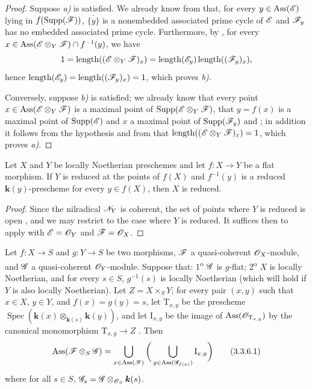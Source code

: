 \begin{proof}
Suppose \emph{a)} is satisfied.
We already know from  that, for every $y\in\operatorname{Ass}(\mathscr{E})$ lying in $f(\operatorname{Supp}(\mathscr{F}))$, $\overline{\{y\}}$ is a nonembedded associated prime cycle of $\mathscr{E}$ and $\mathscr{F}_y$ has no embedded associated prime cycle.
Furthermore, by , for every $x\in\operatorname{Ass}(\mathscr{E}\otimes_Y\mathscr{F})\cap f^{-1}(y)$, we have
\[
1=\operatorname{length}((\mathscr{E}\otimes_Y\mathscr{F})_x)
=\operatorname{length}(\mathscr{E}_y)\operatorname{length}((\mathscr{F}_y)_x),
\]
hence $\operatorname{length}(\mathscr{E}_y)=\operatorname{length}((\mathscr{F}_y)_x)=1$, which proves \emph{b)}.

Conversely, suppose \emph{b)} is satisfied; we already know that every point $x\in\operatorname{Ass}(\mathscr{E}\otimes_Y\mathscr{F})$ is a maximal point of $\operatorname{Supp}(\mathscr{E}\otimes_Y\mathscr{F})$, that $y=f(x)$ is a maximal point of $\operatorname{Supp}(\mathscr{E})$ and $x$ a maximal point of $\operatorname{Supp}(\mathscr{F}_y)$  and ; in addition it follows from the hypothesis and from  that $\operatorname{length}((\mathscr{E}\otimes_Y\mathscr{F})_x)=1$, which proves \emph{a)}.
\end{proof}

\begin{corollary}[3.3.5]
\label{IV.3.3.5}
Let $X$ and $Y$ be locally Noetherian preschemes and let $f:X\to Y$ be a flat morphism.
If $Y$ is reduced at the points of $f(X)$ and $f^{-1}(y)$ is a reduced $\boldsymbol{k}(y)$-prescheme for every $y\in f(X)$, then $X$ is reduced.
\end{corollary}

\begin{proof}
Since the nilradical $\mathscr{N}_Y$ is coherent, the set of points where $Y$ is reduced is open , and we may restrict to the case where $Y$ is reduced.
It suffices then to apply  with $\mathscr{E}=\mathscr{O}_Y$ and $\mathscr{F}=\mathscr{O}_X$.
\end{proof}

\begin{proposition}[3.3.6]
\label{IV.3.3.6}
Let $f:X\to S$ and $g:Y\to S$ be two morphisms, $\mathscr{F}$ a quasi-coherent $\mathscr{O}_X$-module, and $\mathscr{G}$ a quasi-coherent $\mathscr{O}_Y$-module.
Suppose that: 1\textsuperscript{o} $\mathscr{G}$ is $g$-flat; 2\textsuperscript{o} $X$ is locally Noetherian, and for every $s\in S$, $g^{-1}(s)$ is locally Noetherian (which will hold if $Y$ is also locally Noetherian).
Let $Z=X\times_S Y$; for every pair $(x,y)$ such that $x\in X$, $y\in Y$,
and $f(x)=g(y)=s$, let $\mathrm{T}_{x,y}$ be the prescheme $\operatorname{Spec}(\boldsymbol{k}(x)\otimes_{\boldsymbol{k}(s)}\boldsymbol{k}(y))$, and let $\mathrm{I}_{x,y}$ be the image of $\operatorname{Ass}(\mathscr{O}_{\mathrm{T}_{x,y}})$ by the canonical monomorphism $\mathrm{T}_{x,y}\to Z$ .
Then
\[
\label{IV.3.3.6.1}
\operatorname{Ass}(\mathscr{F}\otimes_S\mathscr{G})=\bigcup_{x\in\operatorname{Ass}(\mathscr{F})}\bigg(\bigcup_{y\in\operatorname{Ass}(\mathscr{G}_{f(x)})}\mathrm{I}_{x,y}\bigg)
\tag{3.3.6.1}
\]
where for all $s\in S$, $\mathscr{G}_s=\mathscr{G}\otimes_{\mathscr{O}_S}\boldsymbol{k}(s)$.
\end{proposition}


